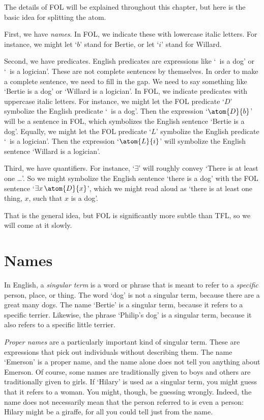 The details of FOL will be explained throughout this chapter, but here is the basic idea for splitting the atom.

First, we have \emph{names}. In FOL, we indicate these with lowercase italic letters. For instance, we might let `$b$' stand for Bertie, or let `$i$' stand for Willard.

Second, we have predicates. English predicates are expressions like `\blank\ is a dog' or `\blank\ is a logician'. These are not complete sentences by themselves. In order to make a complete sentence, we need to fill in the gap. We need to say something like `Bertie is a dog' or `Willard is a logician'. In FOL, we indicate predicates with uppercase italic letters. For instance, we might let the FOL predicate `$D$' symbolize the English predicate `\blank\ is a dog'. Then the expression `$\atom{D}{b}$' will be a sentence in FOL, which symbolizes the English sentence `Bertie is a dog'. Equally, we might let the FOL predicate `$L$' symbolize the English predicate `\blank\ is a logician'. Then the expression `$\atom{L}{i}$' will symbolize the English sentence `Willard is a logician'.

Third, we have quantifiers. For instance, `$\exists$' will roughly convey `There is at least one \ldots'. So we might symbolize the English sentence `there is a dog' with the FOL sentence `$\exists x\, \atom{D}{x}$', which we might read aloud as `there is at least one thing, $x$, such that $x$ is a dog'.

That is the general idea, but FOL is significantly more subtle than TFL, so we will come at it slowly.


\section{Names}
In English, a \emph{singular term} is a word or phrase that is meant
to refer to a \emph{specific} person, place, or thing. The word `dog'
is not a singular term, because there are a great many dogs. The
name `Bertie' is a singular term, because it refers to a specific
terrier. Likewise, the phrase `Philip's dog' is a singular
term, because it also refers to a specific little terrier.

\emph{Proper names} are a particularly important kind of singular term. These are expressions that pick out individuals without describing them. The name `Emerson' is a proper name, and the name alone does not tell you anything about Emerson. Of course, some names are traditionally given to boys and others are traditionally given to girls. If `Hilary' is used as a singular term, you might guess that it refers to a woman. You might, though, be guessing wrongly. Indeed, the name does not necessarily mean that the person referred to is even a person: Hilary might be a giraffe, for all you could tell just from the name.

